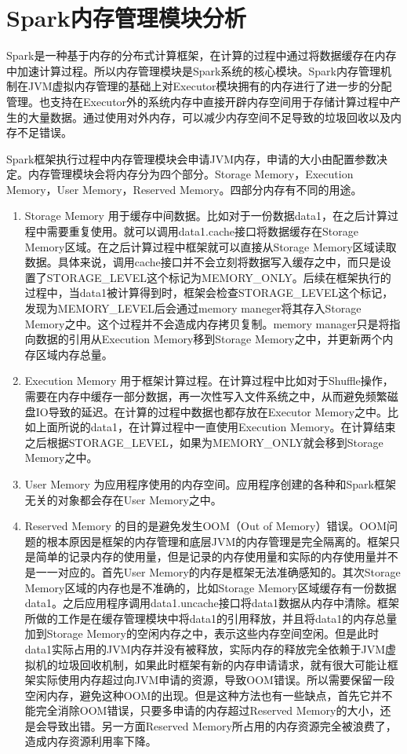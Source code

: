 \section{Spark内存管理模块分析}

Spark是一种基于内存的分布式计算框架，在计算的过程中通过将数据缓存在内存中加速计算过程。所以内存管理模块是Spark系统的核心模块。Spark内存管理机制在JVM虚拟内存管理的基础上对Executor模块拥有的内存进行了进一步的分配管理。也支持在Executor外的系统内存中直接开辟内存空间用于存储计算过程中产生的大量数据。通过使用对外内存，可以减少内存空间不足导致的垃圾回收以及内存不足错误。

Spark框架执行过程中内存管理模块会申请JVM内存，申请的大小由配置参数决定。内存管理模块会将内存分为四个部分。Storage Memory，Execution Memory，User Memory，Reserved Memory。四部分内存有不同的用途。

\begin{enumerate}
    \item Storage Memory 用于缓存中间数据。比如对于一份数据data1，在之后计算过程中需要重复使用。就可以调用data1.cache接口将数据缓存在Storage Memory区域。在之后计算过程中框架就可以直接从Storage Memory区域读取数据。具体来说，调用cache接口并不会立刻将数据写入缓存之中，而只是设置了STORAGE\_LEVEL这个标记为MEMORY\_ONLY。后续在框架执行的过程中，当data1被计算得到时，框架会检查STORAGE\_LEVEL这个标记，发现为MEMORY\_LEVEL后会通过memory maneger将其存入Storage Memory之中。这个过程并不会造成内存拷贝复制。memory manager只是将指向数据的引用从Execution Memory移到Storage Memory之中，并更新两个内存区域内存总量。
    
    \item Execution Memory 用于框架计算过程。在计算过程中比如对于Shuffle操作，需要在内存中缓存一部分数据，再一次性写入文件系统之中，从而避免频繁磁盘IO导致的延迟。在计算的过程中数据也都存放在Executor Memory之中。比如上面所说的data1，在计算过程中一直使用Execution Memory。在计算结束之后根据STORAGE\_LEVEL，如果为MEMORY\_ONLY就会移到Storage Memory之中。
    
    \item User Memory 为应用程序使用的内存空间。应用程序创建的各种和Spark框架无关的对象都会存在User Memory之中。
    
    \item Reserved Memory 的目的是避免发生OOM（Out of Memory）错误。OOM问题的根本原因是框架的内存管理和底层JVM的内存管理是完全隔离的。框架只是简单的记录内存的使用量，但是记录的内存使用量和实际的内存使用量并不是一一对应的。首先User Memory的内存是框架无法准确感知的。其次Storage Memory区域的内存也是不准确的，比如Storage Memory区域缓存有一份数据data1。之后应用程序调用data1.uncache接口将data1数据从内存中清除。框架所做的工作是在缓存管理模块中将data1的引用释放，并且将data1的内存总量加到Storage Memory的空闲内存之中，表示这些内存空间空闲。但是此时data1实际占用的JVM内存并没有被释放，实际内存的释放完全依赖于JVM虚拟机的垃圾回收机制，如果此时框架有新的内存申请请求，就有很大可能让框架实际使用内存超过向JVM申请的资源，导致OOM错误。所以需要保留一段空闲内存，避免这种OOM的出现。但是这种方法也有一些缺点，首先它并不能完全消除OOM错误，只要多申请的内存超过Reserved Memory的大小，还是会导致出错。另一方面Reserved Memory所占用的内存资源完全被浪费了，造成内存资源利用率下降。
\end{enumerate}

